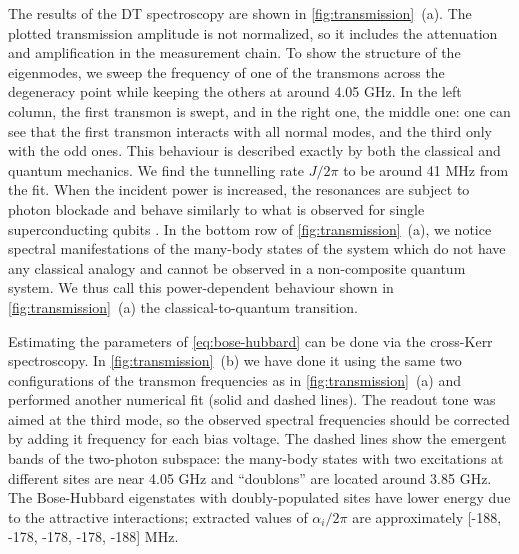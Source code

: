 \documentclass[%
 aps, pra,
 amsmath,amssymb,
 reprint,%
superscriptaddress
]{revtex4-2}
\begin{document}
The results of the DT spectroscopy are shown in \autoref{fig:transmission}~(a). The plotted transmission amplitude is not normalized, so it includes the attenuation and amplification in the measurement chain. To show the structure of the eigenmodes, we sweep the frequency of one of the transmons across the degeneracy point while keeping the others at around 4.05 GHz. In the left column, the first transmon is swept, and in the right one, the middle one: one can see that the first transmon interacts with all normal modes, and the third only with the odd ones. This behaviour is described exactly by both the classical and quantum mechanics. We find the tunnelling rate $J/2\pi$ to be around 41 MHz from the fit. When the incident power is increased, the resonances are subject to photon blockade \cite{birnbaum2005photon} and behave similarly to what is observed for single superconducting qubits \cite{astafiev2010resonance}. In the bottom row of \autoref{fig:transmission}~(a), we notice spectral manifestations of the many-body states of the system which do not have any classical analogy and cannot be observed in a non-composite quantum system. We thus call this power-dependent behaviour shown in \autoref{fig:transmission}~(a) the classical-to-quantum transition. 


Estimating the parameters of \eqref{eq:bose-hubbard} can be done via the cross-Kerr spectroscopy. In \autoref{fig:transmission}~(b) we have done it using the same two configurations of the transmon frequencies as in \autoref{fig:transmission}~(a) and performed another numerical fit (solid and dashed lines). The readout tone was aimed at the third mode, so the observed spectral frequencies should be corrected by adding it frequency for each bias voltage. The dashed lines show the emergent bands of the two-photon subspace: the many-body states with two excitations at different sites are near 4.05 GHz and ``doublons'' \cite{gorlach2018simulation} are located around 3.85 GHz. The Bose-Hubbard eigenstates with doubly-populated sites have lower energy due to the attractive interactions; extracted values of $\alpha_i/2\pi$ are approximately [-188, -178, -178, -178, -188] MHz. 
\end{document}
